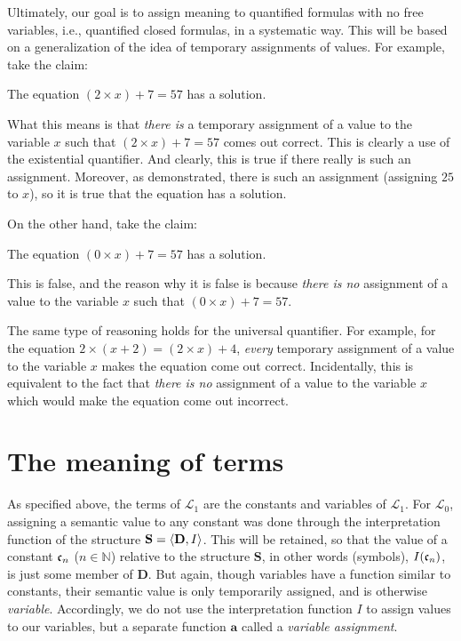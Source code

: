Ultimately, our goal is to assign meaning to quantified formulas with no free variables, i.e., quantified closed formulas, in a systematic way. This will be based on a generalization of the idea of temporary assignments of values. For example, take the claim:
\begin{center}
	The equation $(2\times x)+7=57$ has a solution. 
\end{center}
What this means is that \textit{there is} a temporary assignment of a value to the variable $x$ such that $(2\times x)+7=57$ comes out correct. This is clearly a use of the existential quantifier. And clearly, this is true if there really is such an assignment. Moreover, as demonstrated, there is such an assignment (assigning $25$ to $x$), so it is true that the equation has a solution. 

On the other hand, take the claim: 
\begin{center}
	The equation $(0\times x)+7=57$ has a solution. 
\end{center}
This is false, and the reason why it is false is because \textit{there is no} assignment of a value to the variable $x$ such that $(0\times x)+7=57$. 

The same type of reasoning holds for the universal quantifier. For example, for the equation $2 \times (x + 2)=(2 \times x) + 4$, \textit{every} temporary assignment of a value to the variable $x$ makes the equation come out correct. Incidentally, this is equivalent to the fact that \textit{there is no} assignment of a value to the variable $x$ which would make the equation come out incorrect. 

\section{The meaning of terms}

As specified above, the terms of $\mathcal{L}_1$ are the constants and variables of $\mathcal{L}_1$. For $\mathcal{L}_0$, assigning a semantic value to any constant was done through the interpretation function of the structure $\mathbf{S}=\langle\mathbf{D}, I\rangle$. This will be retained, so that the value of a constant $\mathfrak{c}_{n}$ ($n \in \mathbb{N}$) relative to the structure $\mathbf{S}$, in other words (symbols), $I(\mathfrak{c}_{n})$, is just some member of $\mathbf{D}$. But again, though variables have a function similar to constants, their semantic value is only temporarily assigned, and is otherwise \textit{variable}. Accordingly, we do not use the interpretation function $I$ to assign values to our variables, but a separate function $\mathbf{a}$ called a \textit{variable assignment}. 

